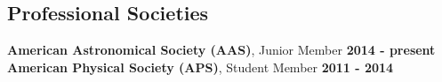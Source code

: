 \documentclass[margin]{res}
\begin{document}
\begin{resume}











\section{Professional Societies}
{\bf American Astronomical Society (AAS)}, Junior Member  \hfill {\bf 2014 - present}\\
{\bf American Physical Society (APS)}, Student Member  \hfill {\bf 2011 - 2014}





\end{resume}
\end{document}
